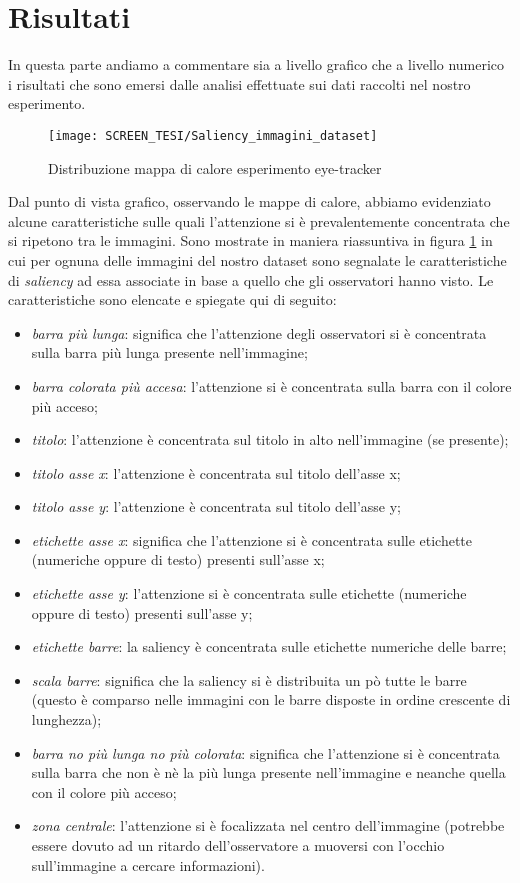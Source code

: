 \documentclass[%
	corpo=12pt,
    twoside,
    stile=classica,
    oldstyle,
    tipotesi=custom,
    greek,
    evenboxes,
]{toptesi}
\begin{document}
{\newpage 

\section{Risultati}

In questa parte andiamo a commentare sia a livello grafico che a livello numerico i risultati che sono emersi dalle analisi effettuate sui dati raccolti nel nostro esperimento.


\begin{figure}[!htb]\centering
\texttt{[image: SCREEN\_TESI/Saliency\_immagini\_dataset]}
\caption{Distribuzione mappa di calore esperimento eye-tracker}\label{fig: Saliency_immagini_dataset}
\end{figure}

Dal punto di vista grafico, osservando le mappe di calore, abbiamo evidenziato alcune caratteristiche sulle quali l'attenzione si è prevalentemente concentrata che si ripetono tra le immagini. Sono mostrate in maniera riassuntiva in figura \ref{fig: Saliency_immagini_dataset} in cui per ognuna delle immagini del nostro dataset sono segnalate le caratteristiche di \textit{saliency} ad essa associate in base a quello che gli osservatori hanno visto. Le caratteristiche sono elencate e spiegate qui di seguito:
\begin{itemize}
\item \textit{barra più lunga}: significa che l'attenzione degli osservatori si è concentrata sulla barra più lunga presente nell'immagine;
\item \textit{barra colorata più accesa}: l'attenzione si è concentrata sulla barra con il colore più acceso;
\item \textit{titolo}: l'attenzione è concentrata sul titolo in alto nell'immagine (se presente);
\item \textit{titolo asse x}: l'attenzione è concentrata sul titolo dell'asse x;
\item \textit{titolo asse y}:  l'attenzione è concentrata sul titolo dell'asse y;
\item \textit{etichette asse x}: significa che l'attenzione si è concentrata sulle etichette (numeriche oppure di testo) presenti sull'asse x;
\item \textit{etichette asse y}: l'attenzione si è concentrata sulle etichette (numeriche oppure di testo) presenti sull'asse y;
\item \textit{etichette barre}: la saliency è concentrata sulle etichette numeriche delle barre;
\item \textit{scala barre}: significa che la saliency si è distribuita un pò tutte le barre (questo è comparso nelle immagini con le barre disposte in ordine crescente di lunghezza);
\item \textit{barra no più lunga no più colorata}: significa che l'attenzione si è concentrata sulla barra che non è nè la più lunga presente nell'immagine e neanche quella con il colore più acceso;
\item \textit{zona centrale}: l'attenzione si è focalizzata nel centro dell'immagine (potrebbe essere dovuto ad un ritardo dell'osservatore a muoversi con l'occhio sull'immagine a cercare informazioni).
\end{itemize}

}
\end{document}
